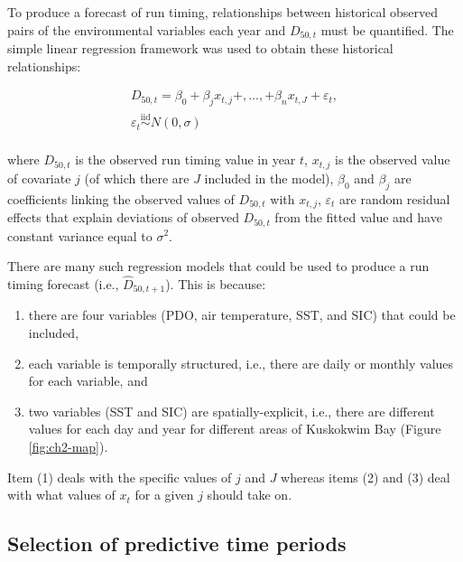 \documentclass[12pt,]{book}
\providecommand{\tightlist}{%
  \setlength{\itemsep}{0pt}\setlength{\parskip}{0pt}}
\theoremstyle{definition}
\theoremstyle{definition}
\theoremstyle{definition}
\theoremstyle{remark}
\begin{document}
To produce a forecast of run timing, relationships between historical
observed pairs of the environmental variables each year and \(D_{50,t}\)
must be quantified. The simple linear regression framework was used to
obtain these historical relationships:

\begin{equation}
  \begin{split}
    D_{50,t} = \beta_0 + \beta_j x_{t,j} +,...,+ \beta_n x_{t,J} + \varepsilon_t, \\
    \varepsilon_t \stackrel{\text{iid}}{\sim} N(0, \sigma) \\
  \end{split}
\label{eq:lin-reg}
\end{equation}

\noindent
where \(D_{50,t}\) is the observed run timing value in year \(t\),
\(x_{t,j}\) is the observed value of covariate \(j\) (of which there are
\(J\) included in the model), \(\beta_0\) and \(\beta_j\) are
coefficients linking the observed values of \(D_{50,t}\) with
\(x_{t,j}\), \(\varepsilon_t\) are random residual effects that explain
deviations of observed \(D_{50,t}\) from the fitted value and have
constant variance equal to \(\sigma^2\).

There are many such regression models that could be used to produce a
run timing forecast (i.e., \(\hat{D}_{50,t+1}\)). This is because:

\begin{enumerate}
\def\labelenumi{(\arabic{enumi})}
\tightlist
\item
  there are four variables (PDO, air temperature, SST, and SIC) that
  could be included,
\item
  each variable is temporally structured, i.e., there are daily or
  monthly values for each variable, and
\item
  two variables (SST and SIC) are spatially-explicit, i.e., there are
  different values for each day and year for different areas of
  Kuskokwim Bay (Figure \ref{fig:ch2-map}).
\end{enumerate}

\noindent
Item (1) deals with the specific values of \(j\) and \(J\) whereas items
(2) and (3) deal with what values of \(x_{t}\) for a given \(j\) should
take on.

\subsection{Selection of predictive time periods}\label{clim-windows}
\end{document}
